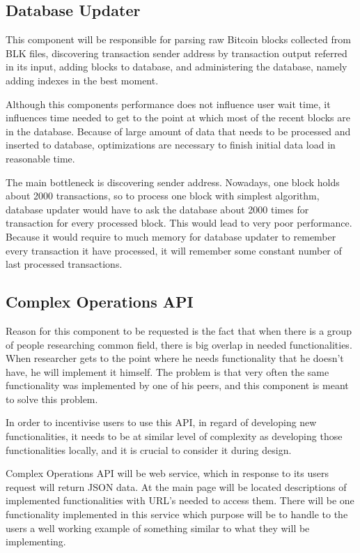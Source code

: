 \documentclass[12pt, en, eng, oneside]{mgr}
\begin{document}
\subsection{Database Updater}
This component will be responsible for parsing raw Bitcoin blocks collected from BLK files, discovering transaction sender address by transaction output referred in its input, adding blocks to database, and administering the database, namely adding indexes in the best moment.

Although this components performance does not influence user wait time, it influences time needed to get to the point at which most of the recent blocks are in the database. Because of large amount of data that needs to be processed and inserted to database, optimizations are necessary to finish initial data load in reasonable time.

The main bottleneck is discovering sender address. Nowadays, one block holds about 2000 transactions, so to process one block with simplest algorithm, database updater would have to ask the database about 2000 times for transaction for every processed block. This would lead to very poor performance. Because it would require to much memory for database updater to remember every transaction it have processed, it will remember some constant number of last processed transactions.

\subsection{Complex Operations API}
Reason for this component to be requested is the fact that when there is a group of people researching common field, there is big overlap in needed functionalities. When researcher gets to the point where he needs functionality that he doesn't have, he will implement it himself. The problem is that very often the same functionality was implemented by one of his peers, and this component is meant to solve this problem. 

In order to incentivise users to use this API, in regard of developing new functionalities, it needs to be at similar level of complexity as developing those functionalities locally, and it is crucial to consider it during design.

Complex Operations API will be web service, which in response to its users request will return JSON data. At the main page will be located descriptions of implemented functionalities with URL's needed to access them. There will be one functionality implemented in this service which purpose will be to handle to the users a well working example of something similar to what they will be implementing.   
\end{document}
